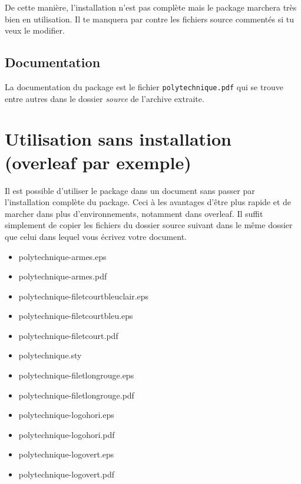\documentclass[a4paper,12pt,twoside]{article}
\begin{document}
De cette manière, l'installation n'est pas complète mais le package marchera très bien en utilisation. Il te manquera par contre les fichiers source commentés si tu veux le modifier.

\subsection{Documentation}

La documentation du package est le fichier \texttt{polytechnique.pdf} qui se trouve entre autres dans le dossier \emph{source} de l'archive extraite.

\section{Utilisation sans installation (overleaf par exemple)}
Il est possible d'utiliser le package dans un document sans passer par l'installation complète du package. 
Ceci à les avantages d'être plus rapide et de marcher dans plus d'environnements, notamment dans overleaf.
Il suffit simplement de copier les fichiers du dossier source suivant dans le même dossier que celui dans lequel vous écrivez votre document.

\begin{minipage}{.45\textwidth}
\begin{itemize}
\item polytechnique-armes.eps
\item polytechnique-armes.pdf
\item polytechnique-filetcourtbleuclair.eps
\item polytechnique-filetcourtbleu.eps
\item polytechnique-filetcourt.pdf
\end{itemize}
\end{minipage}\begin{minipage}{.45\textwidth}
\begin{itemize}
\item polytechnique.sty
\item polytechnique-filetlongrouge.eps
\item polytechnique-filetlongrouge.pdf
\item polytechnique-logohori.eps
\item polytechnique-logohori.pdf
\item polytechnique-logovert.eps
\item polytechnique-logovert.pdf
\end{itemize}

\end{minipage}
\end{document}
